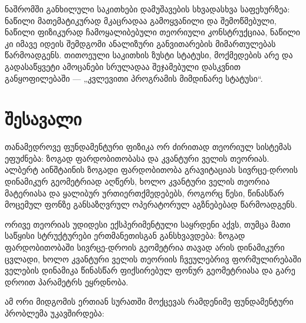 \documentclass[11pt,a4paper]{article}
\begin{document}
ნაშრომში განხილული საკითხები დამუშავების სხვადასხვა საფეხურზეა: ნაწილი მათემატიკურად მკაცრადაა გამოყვანილი და შემოწმებული, ნაწილი ფიზიკურად ჩამოყალიბებული თეორიული კონსტრუქციაა, ნაწილი კი იმავე იდეის შემდგომი ანალიზური განვითარების მიმართულებას წარმოადგენს. თითოეული საკითხის ზუსტი სტატუსი, მოქმედების არე და გადასაწყვეტი ამოცანები სრულადაა შეჯამებული დასკვნით განყოფილებაში — „კვლევითი პროგრამის მიმდინარე სტატუსი“.


\section*{შესავალი}

თანამედროვე ფუნდამენტური ფიზიკა ორ ძირითად თეორიულ სისტემას ეფუძნება: ზოგად ფარდობითობასა და კვანტური ველის თეორიას. ალბერტ აინშტაინის ზოგადი ფარდობითობა გრავიტაციას სივრცე-დროის დინამიკურ გეომეტრიად აღწერს, ხოლო კვანტური ველის თეორია მატერიასა და ყალიბურ ურთიერთქმედებებს, როგორც წესი, წინასწარ მოცემულ ფონზე განსაზღვრულ ოპერატორულ აგზნებებად წარმოადგენს.

ორივე თეორიას უდიდესი ექსპერიმენტული საყრდენი აქვს, თუმცა მათი საწყისი სტრუქტურები ერთმანეთისგან განსხვავდება: ზოგად ფარდობითობაში სივრცე-დროის გეომეტრია თავად არის დინამიკური ცვლადი, ხოლო კვანტური ველის თეორიის ჩვეულებრივ ფორმულირებაში ველების დინამიკა წინასწარ ფიქსირებულ ფონურ გეომეტრიასა და გარე დროით პარამეტრს ეყრდნობა.

ამ ორი მიდგომის ერთიან სურათში მოქცევას რამდენიმე ფუნდამენტური პრობლემა უკავშირდება:
\end{document}
